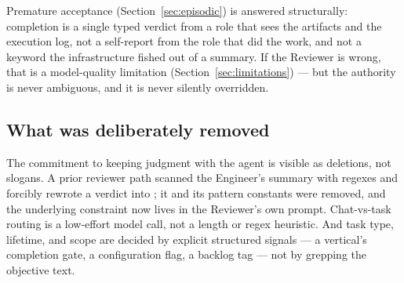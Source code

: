 \begin{callout}
Premature acceptance (Section~\ref{sec:episodic}) is answered structurally:
completion is a single typed verdict from a role that sees the artifacts and the
execution log, not a self-report from the role that did the work, and not a
keyword the infrastructure fished out of a summary. If the Reviewer is wrong, that
is a model-quality limitation (Section~\ref{sec:limitations}) --- but the authority
is never ambiguous, and it is never silently overridden.
\end{callout}

\subsection{What was deliberately removed}

The commitment to keeping judgment with the agent is visible as deletions, not
slogans. A prior reviewer path
scanned the Engineer's summary with regexes and forcibly rewrote a 
verdict into ; it and its pattern constants were removed, and the
underlying constraint now lives in the Reviewer's own prompt. Chat-vs-task routing
is a low-effort model call, not a length or regex heuristic. And task type,
lifetime, and scope are decided by explicit structured signals --- a vertical's
completion gate, a configuration flag, a backlog tag --- not by grepping the
objective text.
